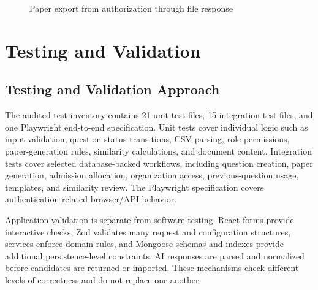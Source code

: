 \begin{figure}[H]
    \centering
    \caption{Paper export from authorization through file response}
    \label{fig:ch3-seq-export}
\end{figure}

\section{Testing and Validation}

\subsection{Testing and Validation Approach}

The audited test inventory contains 21 unit-test files, 15 integration-test files, and one Playwright end-to-end specification. Unit tests cover individual logic such as input validation, question status transitions, CSV parsing, role permissions, paper-generation rules, similarity calculations, and document content. Integration tests cover selected database-backed workflows, including question creation, paper generation, admission allocation, organization access, previous-question usage, templates, and similarity review. The Playwright specification covers authentication-related browser/API behavior.

Application validation is separate from software testing. React forms provide interactive checks, Zod validates many request and configuration structures, services enforce domain rules, and Mongoose schemas and indexes provide additional persistence-level constraints. AI responses are parsed and normalized before candidates are returned or imported. These mechanisms check different levels of correctness and do not replace one another.

